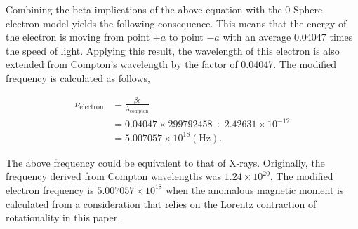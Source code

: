 \documentclass[%
 reprint,
 amsmath,amssymb,
 aps,
]{revtex4-1}
\numberwithin{equation}{section}%
\begin{document}
Combining the beta implications of the above equation with the 0-Sphere electron model yields the following consequence. This means that the energy of the electron is moving from point $+a$ to point $-a$ with an average 0.04047 times the speed of light. Applying this result, the wavelength of this electron is also extended from Compton's wavelength by the factor of 0.04047. The modified frequency is calculated as follows,


    \begin{equation}
        \begin{split}
            \nu_{\mathrm{electron}} 
                &= \frac{\beta c}{\lambda_{\mathrm{compton}}}  \\
                &= 0.04047 \times 299792458 \div 2.42631\times10^{-12} \\
                &= 5.007057 \times 10^{18} \mathrm{(Hz)}
                .
        \label{nu_electron}
        \end{split}
    \end{equation}



 The above frequency could be equivalent to that of X-rays. Originally, the frequency derived from Compton wavelengths was $1.24\times10^{20}$. The modified electron frequency is $5.007057\times10^{18}$ when the anomalous magnetic moment is calculated from a consideration that relies on the Lorentz contraction of rotationality in this paper.






\end{document}
